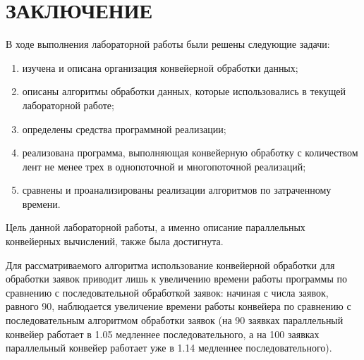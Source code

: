 \chapter*{ЗАКЛЮЧЕНИЕ}

В ходе выполнения лабораторной работы были решены следующие задачи:

\begin{enumerate}[label={\arabic*)}]
	\item изучена и описана организация конвейерной обработки данных;
	\item описаны алгоритмы обработки данных, которые использовались в
	текущей лабораторной работе;
	\item определены средства программной реализации;
	\item реализована программа, выполняющая конвейерную обработку с количеством лент не менее трех в однопоточной и многопоточной реализаций;
	\item сравнены и проанализированы реализации алгоритмов по затраченному времени.
\end{enumerate}

Цель данной лабораторной работы, а именно описание параллельных конвейерных вычислений, также была достигнута.

Для рассматриваемого алгоритма использование конвейерной обработки для обработки заявок приводит лишь к увеличению времени работы программы по сравнению с последовательной обработкой заявок: начиная с числа заявок, равного 90, наблюдается увеличение времени работы конвейера по сравнению с последовательным алгоритмом обработки заявок (на 90 заявках параллельный конвейер работает в 1.05 медленнее последовательного, а на 100 заявках параллельный конвейер работает уже в 1.14 медленнее последовательного).